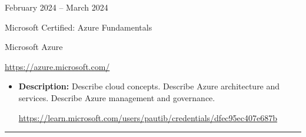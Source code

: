\documentclass[a4paper,10pt]{article}
\newlength{\cvcolumngapwidth}
\newlength{\cvleftcolumnwidth}
\newlength{\cvrightcolumnwidth}
\newcommand{\cvsectionstyle}[1]{{\normalsize\cvsectionfont\textcolor{cvsectioncolor}{#1}}}
\newcommand{\cvtitlestyle}[1]{{\large\cvtitlefont\textcolor{cvtitlecolor}{#1}}}
\newcommand{\cvdurationstyle}[1]{{\small\cvdurationfont\textcolor{cvdurationcolor}{#1}}}
\newlength{\cvafteritemskipamount}
\newlength{\cvaftersectionskipamount}
\newlength{\cvbetweensectionandheadingextraskipamount}
\newlength{\cvaftertitleskipamount}
\newlength{\cvparskip}
\newcommand{\cvsection}[1]{
    \begin{minipage}[t]{\cvleftcolumnwidth}
        \raggedleft\cvsectionstyle{#1}
    \end{minipage}%
    \hspace{\cvcolumngapwidth}%
    \begin{minipage}[t]{\cvrightcolumnwidth}
        \textcolor{cvrulecolor}{\rule{\cvrightcolumnwidth}{0.3mm}}
    \end{minipage}

    \vspace{\cvaftersectionskipamount}
}
\newcommand{\cvitem}[2]{
    \begin{minipage}[t]{\cvleftcolumnwidth}
        \raggedleft #1
    \end{minipage}%
    \hspace{\cvcolumngapwidth}%
    \begin{minipage}[t]{\cvrightcolumnwidth}
        \setlength{\parskip}{\cvparskip} #2
    \end{minipage}

    \vspace{\cvafteritemskipamount}
}
\newcommand{\cvtitle}[1]{
    \cvtitlestyle{#1}

    \vspace{\cvaftertitleskipamount}
    \vspace{-\cvparskip}
}
\begin{document}
\cvitem{
 \cvdurationstyle{February 2024 -- March 2024 \hspace{10pt}}
}{
    \cvtitle{Microsoft Certified: Azure Fundamentals}
    
    Microsoft Azure
    \vspace{5pt}
    \begin{center}
        \url{https://azure.microsoft.com/}
    \end{center}
    \begin{itemize}[leftmargin=*]
        \item \textbf{Description:} Describe cloud concepts. Describe Azure architecture and services. Describe Azure management and governance.

        \begin{center}
            \url{https://learn.microsoft.com/users/pautib/credentials/dfec95ec407e687b}
        \end{center}
          
    \end{itemize}
}



\cvsection{SKILLS}

\vspace{\cvbetweensectionandheadingextraskipamount}
\end{document}
